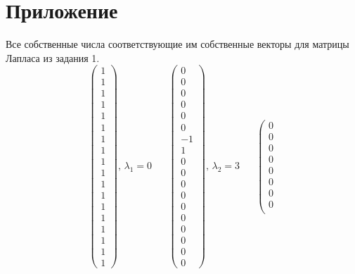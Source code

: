 \documentclass[a5paper, 10pt]{article}
\theoremstyle{definition}
\theoremstyle{plain}
\theoremstyle{remark}
\begin{document}
\section{Приложение}
Все собственные числа соответствующие им собственные векторы для матрицы Лапласа из задания 1.
\begin{equation*}
\left(\begin{matrix}
1 \\
1 \\
1 \\
1 \\
1 \\
1 \\
1 \\
1 \\
1 \\
1 \\
1 \\
1 \\
1 \\
1 \\
1 \\
1 \\
1 \\
1
\end{matrix}\right)
 , \, \lambda_ 1 = 0\,\,\,\,\,\,\,\,\,\,
\left(\begin{matrix}
0 \\
0 \\
0 \\
0 \\
0 \\
0 \\
-1 \\
1 \\
0 \\
0 \\
0 \\
0 \\
0 \\
0 \\
0 \\
0 \\
0 \\
0
\end{matrix}\right)
, \, \lambda_ 2 = 3\,\,\,\,\,\,\,\,\,\,
\left(\begin{matrix}
0 \\
0 \\
0 \\
0 \\
0 \\
0 \\
0 \\
0 \\

\end{matrix}
\end{equation*}
\end{document}
